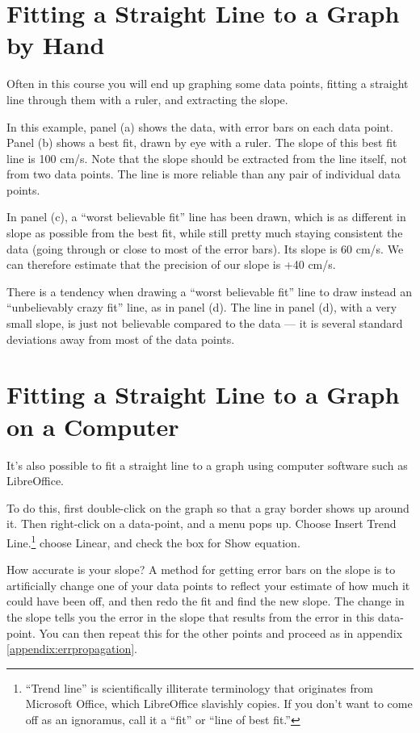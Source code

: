 \section{Fitting a Straight Line to a Graph by Hand}

Often in this course you will end up graphing some data
points, fitting a straight line through them with a ruler,
and extracting the slope.


In this example, panel (a) shows the data, with error bars
on each data point. Panel (b) shows a best fit, drawn by eye
with a ruler. The slope of this best fit line is 100 cm/s.
Note that the slope should be extracted from the line
itself, not from two data points. The line is more reliable
than any pair of individual data points.

In panel (c), a ``worst believable fit'' line has been
drawn, which is as different in slope as possible from the
best fit, while still pretty much staying consistent the
data (going through or close to most of the error bars). Its
slope is 60 cm/s. We can therefore estimate that the
precision of our slope is +40 cm/s.

There is a tendency when drawing a ``worst believable fit''
line to draw instead an ``unbelievably crazy fit'' line, as
in panel (d). The line in panel (d), with a very small
slope, is just not believable compared to the data --- it is
several standard deviations away from most of the data points.

\section{Fitting a Straight Line to a Graph on a Computer}
It's also possible to fit a straight line to a graph using computer
software such as LibreOffice. 

To do this, first double-click on the graph so that a gray border shows up around
it. Then right-click on a data-point, and a menu pops up. 
Choose Insert Trend Line.\footnote{``Trend line'' is scientifically illiterate terminology
that originates from Microsoft Office, which LibreOffice slavishly copies. If you
don't want to come off as an ignoramus, call it a ``fit'' or ``line of best fit.''
} choose Linear, and check the box for Show equation.

How accurate is your slope? A method for getting error bars on the slope
is to artificially change one of your data
points to reflect your estimate of how much it could have been off,
and then redo the fit and find the new slope. The change in the slope
tells you the error in the slope that results from the error in this
data-point. You can then repeat this for the other points and
proceed as in appendix \ref{appendix:errpropagation}.

